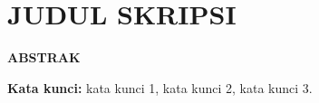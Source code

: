 \chapter*{JUDUL SKRIPSI}
\begin{center}
	\vspace{0.5cm}
	\textbf{ABSTRAK}
\end{center}
\qquad\lipsum[1]

\noindent\textbf{Kata kunci:} kata kunci 1, kata kunci 2, kata kunci 3.
\cleardoublepage

